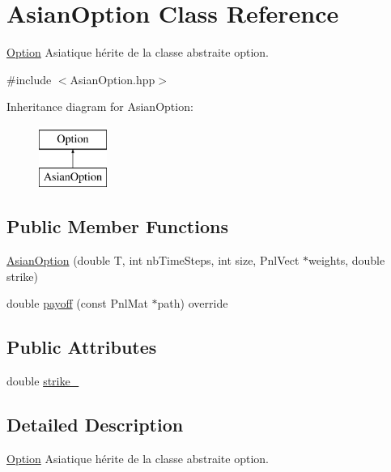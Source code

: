 \hypertarget{classAsianOption}{\section{Asian\-Option Class Reference}
\label{classAsianOption}
}


\hyperlink{classOption}{Option} Asiatique hérite de la classe abstraite option.  




{\ttfamily \#include $<$Asian\-Option.\-hpp$>$}

Inheritance diagram for Asian\-Option\-:\begin{figure}[H]
\begin{center}
\leavevmode
\includegraphics[height=2.000000cm]{classAsianOption}
\end{center}
\end{figure}
\subsection*{Public Member Functions}
\begin{DoxyCompactItemize}
\item 
\hyperlink{classAsianOption_a6e9a45c005716e8e5eec0094b242a615}{Asian\-Option} (double T, int nb\-Time\-Steps, int size, Pnl\-Vect $\ast$weights, double strike)
\item 
double \hyperlink{classAsianOption_a0ac88380a30a7c0ef6a5c5159d15fa76}{payoff} (const Pnl\-Mat $\ast$path) override
\end{DoxyCompactItemize}
\subsection*{Public Attributes}
\begin{DoxyCompactItemize}
\item 
double \hyperlink{classAsianOption_a05e393157001728b21918c8342d7e7e1}{strike\-\_\-}
\end{DoxyCompactItemize}


\subsection{Detailed Description}
\hyperlink{classOption}{Option} Asiatique hérite de la classe abstraite option. 

